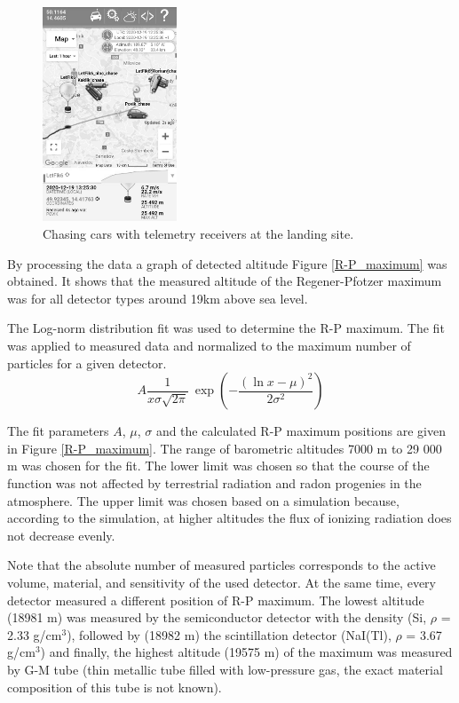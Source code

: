 \documentclass{Rpd}
\begin{document}
\begin{figure}%
	\centerline{\includegraphics[width=40mm]{img/FIK-6_rescue_team.png}}
	\caption{Chasing cars with telemetry receivers at the landing site. \label{FIK-6_rescue_team}}
\end{figure}

By processing the data a graph of detected altitude Figure \ref{R-P_maximum} was obtained. It shows that the measured altitude of the Regener-Pfotzer maximum was for all detector types around 19km above sea level.

The Log-norm distribution fit was used to determine the R-P maximum. The fit was applied to measured data and normalized to the maximum number of particles for a given detector.
\begin{equation}A \frac 1 {x\sigma\sqrt{2\pi}}\ \exp\left( - \frac{\left(\ln x-\mu\right)^2}{2\sigma^2}\right)\end{equation}

The fit parameters $A$, $\mu$, $\sigma$ and the calculated R-P maximum positions are given in Figure \ref{R-P_maximum}. The range of barometric altitudes 7000 m to 29 000 m was chosen for the fit. The lower limit was chosen so that the course of the function was not affected by terrestrial radiation and radon progenies in the atmosphere. The upper limit was chosen based on a simulation because, according to the simulation, at higher altitudes the flux of ionizing radiation does not decrease evenly. 

Note that the absolute number of measured particles corresponds to the active volume, material, and sensitivity of the used detector. At the same time, every detector measured a different position of R-P maximum. The lowest altitude (18981 m) was measured by the semiconductor detector with the density (Si, $\rho$ = 2.33 g/cm$^3$), followed by (18982 m) the scintillation detector (NaI(Tl), $\rho$ = 3.67 g/cm$^3$) and finally, the highest altitude (19575 m) of the maximum was measured by G-M tube (thin metallic tube filled with low-pressure gas, the exact material composition of this tube is not known).
\end{document}
